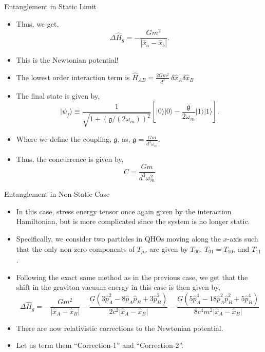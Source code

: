 \documentclass[12pt,aspectratio=1610]{beamer}
\newcommand{\munu}{\mu\nu}
\newcommand{\Hab}{\hat{H}_{AB}}
\begin{document}
\begin{frame}{Entanglement in Static Limit}
\begin{itemize}
    \item Thus, we get, \begin{equation*}
    \Delta \hat{H}_g = -\frac{Gm^2}{|\hat{x}_a - \hat{x}_b|}.
\end{equation*}
    \item This is the Newtonian potential!
    \item The lowest order interaction term is $\Hab = \frac{2Gm^{2}}{d^{3}}\,\delta\hat{x}_{A}\delta\hat{x}_{B}$
    \item The final state is given by,
    \begin{equation*}
    \vert\psi_{f}\rangle\equiv\frac{1}{\sqrt{1+(\mathfrak{g}/(2\omega_{m}))^{2}}}[\vert0\rangle\vert0\rangle-\frac{\mathfrak{g}}{2\omega_{m}}\vert1\rangle\vert1\rangle].
\end{equation*}
\item Where we define the coupling, $\mathfrak{g}$, as, $\mathfrak{g} = \frac{Gm}{d^3\omega_m}.$
    \item Thus, the concurrence is given by, $$C=\frac{Gm}{d^3\omega_m^2}$$
\end{itemize}
\end{frame}

\begin{frame}{Entanglement in Non-Static Case}
\begin{itemize}
    \item In this case, stress energy tensor once again given by the interaction Hamiltonian, but is more complicated since the system is no longer static.
    \item Specifically, we consider two particles in QHOs moving along the $x$-axis such that the only non-zero components of $T_{\munu}$ are given by $T_{00}$, $T_{01} = T_{10}$, and $T_{11}$. 
    \item Following the exact same method as in the previous case, we get that the shift in the graviton vacuum energy in this case is then given by, $$\Delta\hat{H}_{g} =-\frac{Gm^{2}}{\vert{\hat{x}}_{A}-{\hat{x}}_{B}\vert} -\frac{G(3{\hat{p}}_{A}^{2}-8\hat{p}_{A}\hat{p}_{B}+3{\hat{p}}_{B}^{2})}{2c^{2}\vert{\hat{x}}_{A}-{\hat{x}}_{B}\vert} -\frac{G(5{\hat{p}}_{A}^{4}-18{\hat{p}}_{A}^{2}{\hat{p}}_{B}^{2}+5{\hat{p}}_{B}^{4})}{8c^{4}m^{2}\vert{\hat{x}}_{A}-{\hat{x}}_{B}\vert}$$
    \item There are now relativistic corrections to the Newtonian potential.
    \item Let us term them ``Correction-1'' and ``Correction-2''.
\end{itemize}
\end{frame}
\end{document}
